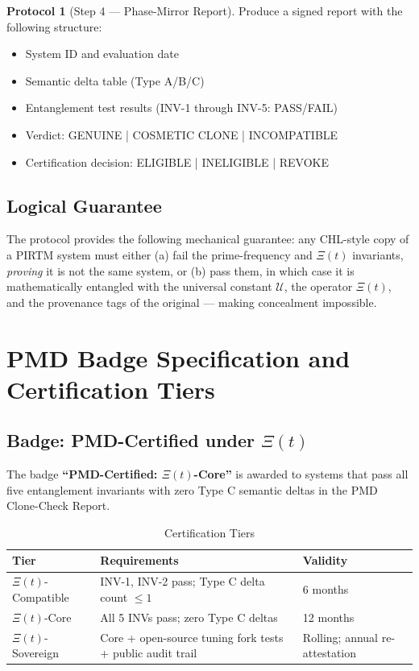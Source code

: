 \documentclass[12pt,letterpaper]{article}
\theoremstyle{definition}
\newtheorem{protocol}{Protocol}[section]
\theoremstyle{remark}
\begin{document}
\begin{protocol}[Step 4 --- Phase-Mirror Report]
Produce a signed report with the following structure:
\begin{itemize}[noitemsep]
\item System ID and evaluation date
\item Semantic delta table (Type A/B/C)
\item Entanglement test results (INV-1 through INV-5: PASS/FAIL)
\item Verdict: GENUINE | COSMETIC CLONE | INCOMPATIBLE
\item Certification decision: ELIGIBLE | INELIGIBLE | REVOKE
\end{itemize}
\end{protocol}

\subsection{Logical Guarantee}

The protocol provides the following mechanical guarantee: any CHL-style copy of a PIRTM system must either (a) fail the prime-frequency and $\Xi(t)$ invariants, \emph{proving} it is not the same system, or (b) pass them, in which case it is mathematically entangled with the universal constant $\mathcal{U}$, the operator $\Xi(t)$, and the provenance tags of the original --- making concealment impossible.

\section{PMD Badge Specification and Certification Tiers}

\subsection{Badge: PMD-Certified under $\Xi(t)$}

The badge \textbf{``PMD-Certified: $\Xi(t)$-Core''} is awarded to systems that pass all five entanglement invariants with zero Type C semantic deltas in the PMD Clone-Check Report.

\begin{table}[H]
\centering
\caption{Certification Tiers}
\begin{tabular}{p{3.2cm}p{6cm}p{2.5cm}}
\toprule
\textbf{Tier} & \textbf{Requirements} & \textbf{Validity} \\
\midrule
$\Xi(t)$-Compatible & INV-1, INV-2 pass; Type C delta count $\leq 1$ & 6 months \\
$\Xi(t)$-Core & All 5 INVs pass; zero Type C deltas & 12 months \\
$\Xi(t)$-Sovereign & Core + open-source tuning fork tests + public audit trail & Rolling; annual re-attestation \\
\bottomrule
\end{tabular}
\end{table}
\end{document}
